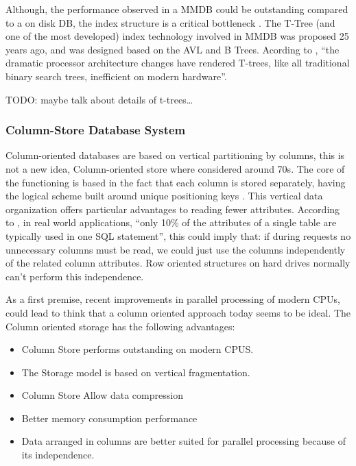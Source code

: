 \documentclass[10pt]{article} %
\begin{document}
Although, the performance observed in a MMDB could be outstanding compared to a on disk DB, the index structure is a critical bottleneck \cite{leisadaptive}. The T-Tree (and one of the most developed) index technology involved in MMDB was proposed 25 years ago, and was designed based on the AVL and B Trees. Acording to , ``the dramatic processor architecture changes have rendered T-trees, like all traditional binary search trees, inefficient on modern hardware''.

TODO: maybe talk about details of t-trees\ldots 


\subsubsection{Column-Store Database System}

Column-oriented databases are based on vertical partitioning by columns, this is not a new idea, Column-oriented store where considered around 70s. The core of the functioning is based in the fact that each column is stored separately, having the logical scheme built around unique positioning keys \cite{krueger2011main}. This vertical data organization offers particular advantages to reading fewer attributes. According to \cite{Plattner}, in real world applications, ``only 10\% of the attributes of a single table are typically used in one SQL statement'', this could imply that: if during requests no unnecessary columns must be read, we could just use the columns independently of the related column attributes. Row oriented structures on hard drives normally can't perform this independence.

As a first premise, recent improvements in parallel processing of modern CPUs, could lead to think that a column oriented approach today seems to be ideal. The Column oriented storage has the following advantages: 

\begin{itemize}
  \item Column Store performs outstanding on modern CPUS.

  \item The Storage model is based on vertical fragmentation.

  \item Column Store Allow data compression

  \item Better memory consumption performance

  \item Data arranged in columns are better suited for parallel processing because of its independence.

\end{itemize}
   
\end{document}
